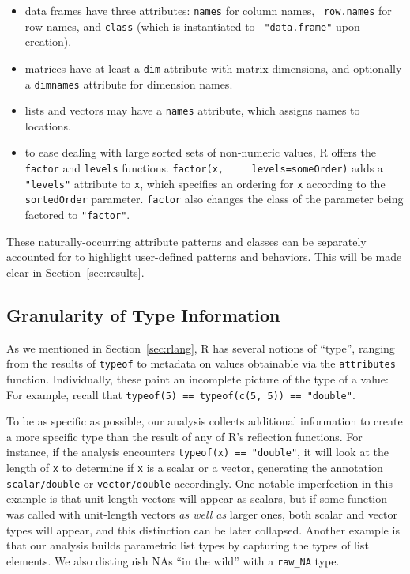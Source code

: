 \documentclass[acmsmall,10pt,review,anonymous]{acmart}\settopmatter{printfolios=true,printccs=false,printacmref=false}
\newcommand{\code}[1]{\lstinline|#1|\xspace}
\begin{document}
\begin{itemize}

\item data frames have three attributes: {\tt names} for column names, {\tt
  row.names} for row names, and {\tt class} (which is instantiated to {\tt
  "data.frame"} upon creation).
	
\item matrices have at least a {\tt dim} attribute with matrix dimensions,
  and optionally a {\tt dimnames} attribute for dimension names.

\item lists and vectors may have a {\tt names} attribute, which assigns
  names to locations.
	
\item to ease dealing with large sorted sets of non-numeric values, R offers
  the \code{factor} and \code{levels} functions.  \code{factor(x,
    levels=someOrder)} adds a {\tt "levels"} attribute to \code{x}, which
  specifies an ordering for \code{x} according to the \code{sortedOrder}
  parameter.  \code{factor} also changes the class of the parameter being
  factored to \texttt{"factor"}.

\end{itemize}

These naturally-occurring attribute patterns and classes can be separately
accounted for to highlight user-defined patterns and behaviors.  This will
be made clear in Section~\ref{sec:results}.

%
%

%
\subsection{Granularity of Type Information}

As we mentioned in Section~\ref{sec:rlang}, R has several notions of
``type'', ranging from the results of \code{typeof} to metadata on values
obtainable via the \code{attributes} function.  Individually, these paint an
incomplete picture of the type of a value: For example, recall that
\code{typeof(5) == typeof(c(5, 5)) == "double"}.

To be as specific as possible, our analysis collects additional information
to create a more specific type than the result of any of R's reflection
functions.  For instance, if the analysis encounters {\tt typeof(x) ==
  "double"}, it will look at the length of {\tt x} to determine if {\tt x}
is a scalar or a vector, generating the annotation {\tt scalar/double} or
{\tt vector/double} accordingly.  One notable imperfection in this example
is that unit-length vectors will appear as scalars, but if some function was
called with unit-length vectors {\it as well as} larger ones, both scalar
and vector types will appear, and this distinction can be later collapsed.
Another example is that our analysis builds parametric list types by
capturing the types of list elements.  We also distinguish NAs ``in the
wild'' with a {\tt raw\_NA} type.
\end{document}
